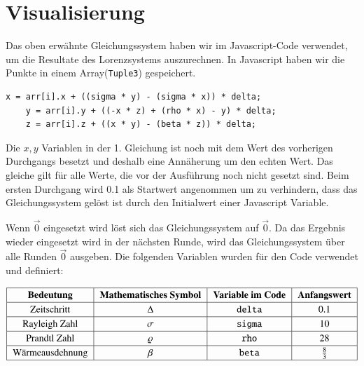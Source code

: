 

\section{Visualisierung}
Das oben erwähnte Gleichungssystem haben wir im Javascript-Code verwendet, um die Resultate des Lorenzsystems auszurechnen. In Javascript haben wir die Punkte in einem Array(\texttt{Tuple3}) gespeichert.

	\begin{lstlisting}[style=C]
	x = arr[i].x + ((sigma * y) - (sigma * x)) * delta;
	y = arr[i].y + ((-x * z) + (rho * x) - y) * delta;
	z = arr[i].z + ((x * y) - (beta * z)) * delta;
	\end{lstlisting}

Die $ x, y $ Variablen in der 1. Gleichung ist noch mit dem Wert des vorherigen Durchgangs besetzt und deshalb eine Annäherung um den echten Wert. Das gleiche gilt für alle Werte, die vor der Ausführung noch nicht gesetzt sind. 
Beim ersten Durchgang wird 0.1 als Startwert angenommen um zu verhindern, dass das Gleichungssystem gelöst ist durch den Initialwert einer Javascript Variable. 

Wenn $ \vec{0} $ eingesetzt wird löst sich das Gleichungssystem auf $ \vec{0} $. Da das Ergebnis wieder eingesetzt wird in der nächsten Runde, wird das Gleichungssystem über alle Runden $ \vec{0} $ ausgeben.
Die folgenden Variablen wurden für den Code verwendet und definiert:

\begin{align}
{\renewcommand{\arraystretch}{1.2}
	\begin{tabular}{| c | c | c | c |}
		\hline
		\textbf{Bedeutung} & \textbf{Mathematisches Symbol} & \textbf{Variable im Code} & \textbf{Anfangswert}\\\hline
		Zeitschritt & $ \Delta $ & \texttt{delta} & 0.1 \\\hline
		Rayleigh Zahl & $ \sigma $ & \texttt{sigma} & 10 \\\hline
		Prandtl Zahl & $\varrho $ & \texttt{rho} & 28 \\\hline
		Wärmeausdehnung & $\beta $ & \texttt{beta}  & $ \frac{8}{3} $ \\\hline
	\end{tabular}
}
\end{align}


